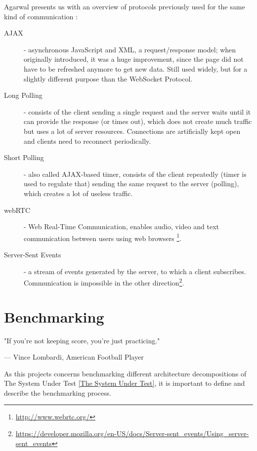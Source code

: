 \documentclass{uvamscse}
\begin{document}
Agarwal presents us with an overview of protocols previously used for the same kind of communication \cite{PushScale}:
\begin{description}
  \item[AJAX]
  - asynchronous JavaScript and XML, a request/response model; when originally introduced, it was a huge improvement, since the page did not have to be refreshed anymore to get new data. Still used widely, but for a slightly different purpose than the WebSocket Protocol.
  \item[Long Polling]
  - consists of the client sending a single request and the server waits until it can provide the response (or times out), which does not create much traffic but uses a lot of server resources. Connections are artificially kept open and clients need to reconnect periodically.
  \item[Short Polling]
  - also called AJAX-based timer, consists of the client repeatedly (timer is used to regulate that) sending the same request to the server (polling), which creates a lot of useless traffic.
  \item[webRTC]
  - Web Real-Time Communication, enables audio, video and text communication between users using web browsers \footnote{\url{http://www.webrtc.org/}}.
  \item[Server-Sent Events]
  - a stream of events generated by the server, to which a client subscribes. Communication is impossible in the other direction\footnote{\url{https://developer.mozilla.org/en-US/docs/Server-sent_events/Using_server-sent_events}}.
\end{description}

\chapter{Benchmarking}\label{Benchmarking}

\epigraph{"If you're not keeping score, you're just practicing."}{--- Vince Lombardi, American Football Player}

As this projects concerns benchmarking different architecture decompositions of The System Under Test \ref{The System Under Test}, it is important to define and describe the benchmarking process.
\end{document}
